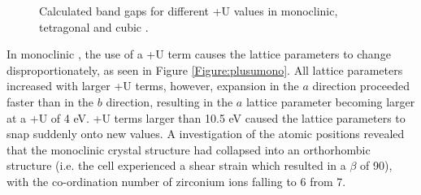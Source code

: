 

\begin{figure}[ht] %
\begin{center}
		\caption{Calculated band gaps for different +U values in monoclinic, tetragonal and cubic \zirconia .}
		\label{Figure:plusubandgap}
	\end{center}
\end{figure}

In monoclinic \zirconia , the use of a +U term causes the lattice parameters to change disproportionately, as seen in Figure \ref{Figure:plusumono}. All lattice parameters increased with larger +U terms, however, expansion in the $a$ direction proceeded faster than in the $b$ direction, resulting in the $a$ lattice parameter becoming larger at a +U of 4 eV. +U terms larger than 10.5 eV caused the lattice parameters to snap suddenly onto new values. A  investigation of the atomic positions revealed that the monoclinic crystal structure had collapsed into an orthorhombic structure (i.e. the cell experienced a shear strain which resulted in a $\beta$ of 90\textdegree), with the co-ordination number of zirconium ions falling to 6 from 7.

